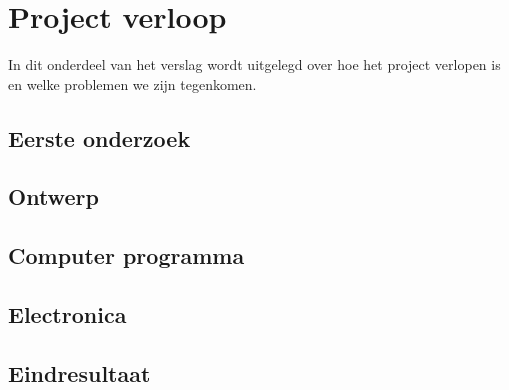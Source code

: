 \chapter{Project verloop}
In dit onderdeel van het verslag wordt uitgelegd over hoe het project verlopen is en welke problemen we zijn tegenkomen.
\section{Eerste onderzoek}

\section{Ontwerp}

\section{Computer programma}

\section{Electronica}

\section{Eindresultaat}
